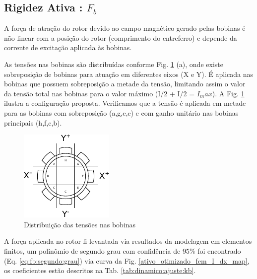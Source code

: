 \subsection{Rigidez Ativa : $F_b$}

A força de atração do rotor devido ao campo magnético gerado pelas bobinas é não linear com a posição do rotor (comprimento do entreferro) e depende da corrente de excitação aplicada às bobinas.  

As tensões nas bobinas são distribuídas conforme Fig. \ref{fig:blocos:tensao:bobinas:x:y} (a), onde existe sobreposição de bobinas para atuação em diferentes eixos (X e Y). É aplicada nas bobinas que possuem sobreposição a metade da tensão, limitando assim o valor da tensão total nas bobinas para o valor máximo (I/2 + I/2 = $I_max$). A Fig. \ref{fig:blocos:tensao:bobinas:x:y} ilustra a configuração proposta. Verificamos que a tensão é aplicada em metade para as bobinas com sobreposição (a,g,e,c) e com ganho unitário nas bobinas principais (h,f,c,b). 

\begin{figure}[th]
\centering
\includegraphics[width=0.7\linewidth]{./Figs/Modelagem/ativo-atuadores-conexao}
\caption{Distribuição das tensões nas bobinas}
\label{fig:blocos:tensao:bobinas:x:y}
\end{figure}

A força aplicada no rotor fi levantada via resultados da modelagem em elementos
finitos, um polinômio de segundo grau com confidência de 95\% foi encontrado
(Eq. \ref{eq:fb:segundo:grau}) via curva da Fig.
\ref{ativo_otimizado_fem_I_dx_map}, os coeficientes estão descritos na Tab. \ref{tab:dinamico:ajuste:kb}.

